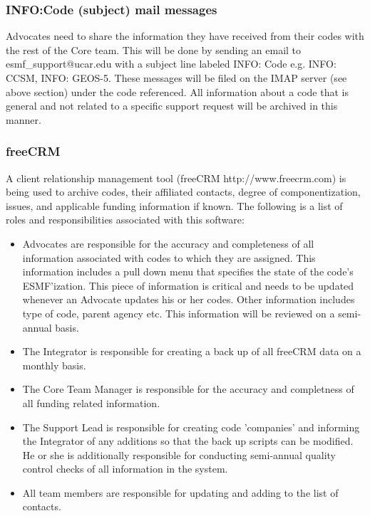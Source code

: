\subsubsection{INFO:Code (subject) mail messages}
\label{infomail}

Advocates need to share the information they have received from their codes with the rest 
of the Core team. This will be done by sending an email to esmf\_support@ucar.edu with a 
subject line labeled INFO: Code e.g. INFO: CCSM, INFO: GEOS-5. These messages will be 
filed on the IMAP server (see above section) under the code referenced. All information 
about a code that is general and not related to a specific support request will be archived 
in this manner. 

\subsubsection{freeCRM}
A client relationship management tool (freeCRM http://www.freecrm.com) is being used 
to archive codes, their affiliated contacts, degree of componentization, issues, and 
applicable funding information if known. The following is a list of roles and 
responsibilities associated with this software:
\begin{itemize}
\item Advocates are responsible for the accuracy and completeness of all information 
associated with codes to which they are assigned.  This information includes a pull 
down menu that specifies the state of the code's ESMF'ization. This piece of 
information is critical and needs to be updated whenever an Advocate updates his or 
her codes. Other information includes type of code, parent agency etc. This 
information will be reviewed on a semi-annual basis. 
\item The Integrator is responsible for creating a back up of all freeCRM data on a 
monthly basis.
\item The Core Team Manager is responsible for the accuracy and completness of all 
funding related information.
\item The Support Lead is responsible for creating code 'companies' and informing 
the Integrator of any additions so that the back up scripts can be modified. He or 
she is additionally responsible for conducting semi-annual quality control checks of 
all information in the system. 
\item All team members are responsible for updating and adding to the list of 
contacts. 
\end{itemize} 

